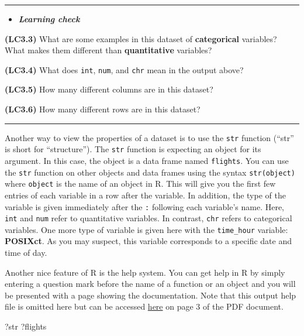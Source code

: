 \documentclass[]{tufte-book}
\newenvironment{Shaded}{\begin{snugshade}}{\end{snugshade}}
\newcommand{\NormalTok}[1]{{#1}}
\let\oldrule=\rule
\renewcommand{\rule}[1]{\oldrule{\linewidth}}
\newenvironment{rmdblock}[1]
  {\begin{shaded*}
  \begin{itemize}
  \renewcommand{\labelitemi}{
    \raisebox{-.7\height}[0pt][0pt]{
    }
  }
  \item
  }
  {
  \end{itemize}
  \end{shaded*}
  }
\newenvironment{learncheck}
  {\begin{rmdblock}{warning}}
  {\end{rmdblock}}
\begin{document}
\begin{center}\rule{0.5\linewidth}{\linethickness}\end{center}

\begin{learncheck}
\textbf{\emph{Learning check}}
\end{learncheck}

\textbf{(LC3.3)} What are some examples in this dataset of
\textbf{categorical} variables? What makes them different than
\textbf{quantitative} variables?

\textbf{(LC3.4)} What does \texttt{int}, \texttt{num}, and \texttt{chr}
mean in the output above?

\textbf{(LC3.5)} How many different columns are in this dataset?

\textbf{(LC3.6)} How many different rows are in this dataset?

\begin{center}\rule{0.5\linewidth}{\linethickness}\end{center}

Another way to view the properties of a dataset is to use the
\texttt{str} function (``str'' is short for ``structure''). The
\texttt{str} function is expecting an object for its argument. In this
case, the object is a data frame named \texttt{flights}. You can use the
\texttt{str} function on other objects and data frames using the syntax
\texttt{str(object)} where \texttt{object} is the name of an object in
R. This will give you the first few entries of each variable in a row
after the variable. In addition, the type of the variable is given
immediately after the \texttt{:} following each variable's name. Here,
\texttt{int} and \texttt{num} refer to quantitative variables. In
contrast, \texttt{chr} refers to categorical variables. One more type of
variable is given here with the \texttt{time\_hour} variable:
\textbf{POSIXct}. As you may suspect, this variable corresponds to a
specific date and time of day.

Another nice feature of R is the help system. You can get help in R by
simply entering a question mark before the name of a function or an
object and you will be presented with a page showing the documentation.
Note that this output help file is omitted here but can be accessed
\href{https://cran.r-project.org/web/packages/nycflights13/nycflights13.pdf}{here}
on page 3 of the PDF document.

\begin{Shaded}
\begin{Highlighting}[]
\NormalTok{?str}
\NormalTok{?flights}
\end{Highlighting}
\end{Shaded}
\end{document}

